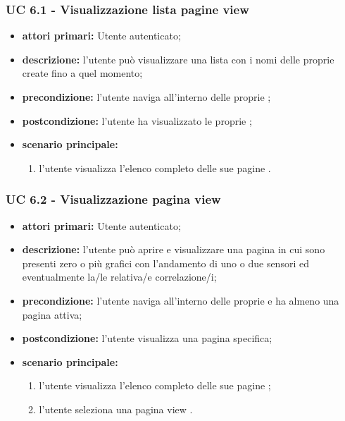 			\subsubsection{UC 6.1 - Visualizzazione lista pagine view}
			\begin{itemize}
				\item \textbf{attori primari:} Utente autenticato;
				\item \textbf{descrizione:} l'utente può visualizzare una lista con i nomi delle proprie  create fino a quel momento;
				\item \textbf{precondizione:} l'utente naviga all'interno delle proprie ;
				\item \textbf{postcondizione:} l'utente ha visualizzato le proprie ;
				\item \textbf{scenario principale:}
				\begin{enumerate}
					\item{l'utente visualizza l'elenco completo delle sue pagine .}
				\end{enumerate}	
			\end{itemize}

			\subsubsection{UC 6.2 - Visualizzazione pagina view}
			\begin{itemize}
				\item \textbf{attori primari:} Utente autenticato;
				\item \textbf{descrizione:} l'utente può aprire e visualizzare una pagina  in cui sono presenti zero o più grafici con l'andamento di uno o due sensori ed eventualmente la/le relativa/e correlazione/i;
				\item \textbf{precondizione:} l'utente naviga all'interno delle proprie  e ha almeno una pagina  attiva;
				\item \textbf{postcondizione:} l'utente visualizza una pagina  specifica;
				\item \textbf{scenario principale:}
				\begin{enumerate}
					\item{l'utente visualizza l'elenco completo delle sue pagine ;}
					\item{l'utente seleziona una pagina view .}
				\end{enumerate}	
			\end{itemize}

